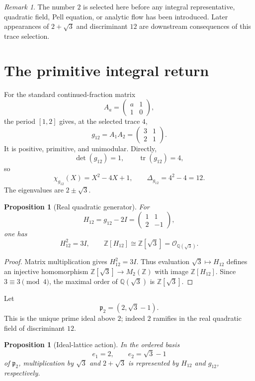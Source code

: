 \documentclass[11pt]{article}
\newtheorem{proposition}[theorem]{Proposition}
\theoremstyle{definition}
\theoremstyle{remark}
\newtheorem{remark}[theorem]{Remark}
\newcommand{\Q}{\mathbb Q}
\newcommand{\Z}{\mathbb Z}
\newcommand{\OO}{\mathcal O}
\newcommand{\tr}{\operatorname{tr}}
\begin{document}
\begin{remark}
The number $2$ is selected here before any integral representative, quadratic
field, Pell equation, or analytic flow has been introduced.  Later
appearances of $2+\sqrt3$ and discriminant $12$ are downstream consequences
of this trace selection.
\end{remark}

\section{The primitive integral return}

For the standard continued-fraction matrix
\[
A_a=\begin{pmatrix}a&1\\1&0\end{pmatrix},
\]
the period $[1,2]$ gives, at the selected trace $4$,
\[
g_{12}=A_1A_2=\begin{pmatrix}3&1\\2&1\end{pmatrix}.
\]
It is positive, primitive, and unimodular.  Directly,
\[
\det(g_{12})=1,
\qquad
\tr(g_{12})=4,
\]
so
\[
\chi_{g_{12}}(X)=X^2-4X+1,
\qquad
\Delta_{g_{12}}=4^2-4=12.
\]
The eigenvalues are $2\pm\sqrt3$.

\begin{proposition}[Real quadratic generator]
\label{prop:real-generator}
For
\[
H_{12}=g_{12}-2I
=\begin{pmatrix}1&1\\2&-1\end{pmatrix},
\]
one has
\[
H_{12}^2=3I,
\qquad
\Z[H_{12}]\cong\Z[\sqrt3]=\OO_{\Q(\sqrt3)}.
\]
\end{proposition}

\begin{proof}
Matrix multiplication gives $H_{12}^2=3I$.  Thus evaluation
$\sqrt3\mapsto H_{12}$ defines an injective homomorphism
$\Z[\sqrt3]\to M_2(\Z)$ with image $\Z[H_{12}]$.  Since
$3\equiv3\pmod4$, the maximal order of $\Q(\sqrt3)$ is
$\Z[\sqrt3]$.
\end{proof}

Let
\[
\mathfrak p_2=(2,\sqrt3-1).
\]
This is the unique prime ideal above $2$; indeed $2$ ramifies in the real
quadratic field of discriminant $12$.

\begin{proposition}[Ideal-lattice action]
\label{prop:ideal-action}
In the ordered basis
\[
e_1=2,
\qquad
e_2=\sqrt3-1
\]
of $\mathfrak p_2$, multiplication by $\sqrt3$ and $2+\sqrt3$ is represented
by $H_{12}$ and $g_{12}$, respectively.
\end{proposition}
\end{document}
